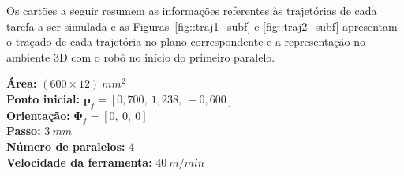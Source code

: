 Os cartões a seguir resumem as informações referentes às trajetórias de cada
tarefa a ser simulada e as Figuras~\ref{fig::traj1_subf} e \ref{fig::traj2_subf}
apresentam o traçado de cada trajetória no plano correspondente e a
representação no ambiente 3D com o robô no início do primeiro paralelo.
%
\newline
\begin{tcolorbox}
[colframe=black!75!white, colback=white, title = Tarefa 1] 
  \textbf{Área:} $(600 \times 12)~mm^2$ \\
  \textbf{Ponto inicial:} $\mathbf{p}_f = [0,700,~1,238,~-0,600]$ \\
  \textbf{Orientação:} $\boldsymbol{\Phi}_{f} = [0,~0,~0]$ \\
  \textbf{Passo:} $3~mm$ \\
  \textbf{Número de paralelos:} 4 \\
  \textbf{Velocidade da ferramenta:} $40~m/min$
\end{tcolorbox}
%
